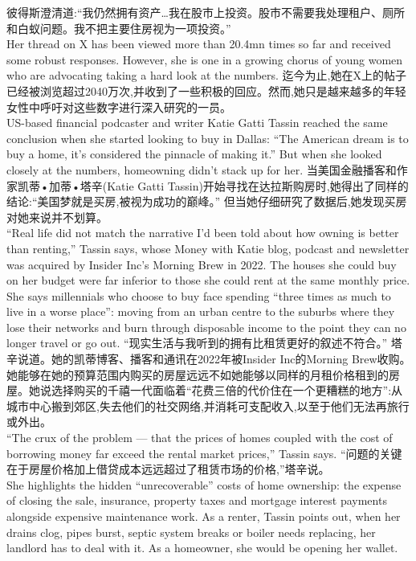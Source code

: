 \documentclass[a4paper,12pt]{article}
\begin{document}
彼得斯澄清道:“我仍然拥有资产…我在股市上投资。股市不需要我处理租户、厕所和白蚁问题。我不把主要住房视为一项投资。”
\\Her thread on X has been viewed more than 20.4mn times so far and received some robust responses. However, she is one in a growing chorus of young women who are advocating taking a hard look at the numbers.
迄今为止,她在X上的帖子已经被浏览超过2040万次,并收到了一些积极的回应。然而,她只是越来越多的年轻女性中呼吁对这些数字进行深入研究的一员。
\\US-based financial podcaster and writer Katie Gatti Tassin reached the same conclusion when she started looking to buy in Dallas: “The American dream is to buy a home, it's considered the pinnacle of making it.” But when she looked closely at the numbers, homeowning didn't stack up for her.
当美国金融播客和作家凯蒂•加蒂•塔辛(Katie Gatti Tassin)开始寻找在达拉斯购房时,她得出了同样的结论:“美国梦就是买房,被视为成功的巅峰。” 但当她仔细研究了数据后,她发现买房对她来说并不划算。
\\“Real life did not match the narrative I'd been told about how owning is better than renting,” Tassin says, whose Money with Katie blog, podcast and newsletter was acquired by Insider Inc's Morning Brew in 2022. The houses she could buy on her budget were far inferior to those she could rent at the same monthly price. She says millennials who choose to buy face spending “three times as much to live in a worse place”: moving from an urban centre to the suburbs where they lose their networks and burn through disposable income to the point they can no longer travel or go out.
“现实生活与我听到的拥有比租赁更好的叙述不符合。” 塔辛说道。她的凯蒂博客、播客和通讯在2022年被Insider Inc的Morning Brew收购。她能够在她的预算范围内购买的房屋远远不如她能够以同样的月租价格租到的房屋。她说选择购买的千禧一代面临着“花费三倍的代价住在一个更糟糕的地方”:从城市中心搬到郊区,失去他们的社交网络,并消耗可支配收入,以至于他们无法再旅行或外出。
\\“The crux of the problem — that the prices of homes coupled with the cost of borrowing money far exceed the rental market prices,” Tassin says.
“问题的关键在于房屋价格加上借贷成本远远超过了租赁市场的价格,”塔辛说。
\\She highlights the hidden “unrecoverable” costs of home ownership: the expense of closing the sale, insurance, property taxes and mortgage interest payments alongside expensive maintenance work. As a renter, Tassin points out, when her drains clog, pipes burst, septic system breaks or boiler needs replacing, her landlord has to deal with it. As a homeowner, she would be opening her wallet.
\end{document}
